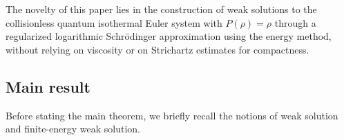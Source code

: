 \documentclass[11pt]{article}
\begin{document}
\medskip


The novelty of this paper lies in the construction of weak solutions to the collisionless quantum isothermal Euler system with \(P(\rho)=\rho\) through a regularized logarithmic Schr\"odinger approximation using the energy method, without relying on viscosity or on Strichartz estimates for compactness.

\medskip




 
 

 \subsection*{Main result}
 
Before stating the main theorem, we briefly recall the notions of weak solution and finite-energy weak solution.
\end{document}
